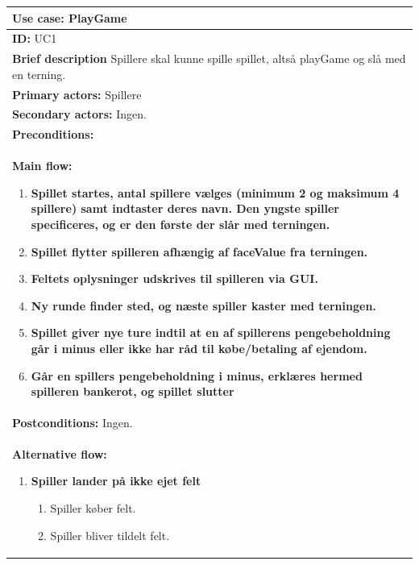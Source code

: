 \begin{table}[H]
    \begin{center}
        \begin{tabular}{ | p{15cm} |}
            \hline
            \textbf{Use case:} PlayGame \\ \hline
            \textbf{ID:} UC1 \\ \hline
            \textbf{Brief description} Spillere skal kunne spille spillet, altså playGame og slå med en terning.     \\ \hline
            \textbf{Primary actors:} Spillere \\ \hline
            \textbf{Secondary actors:} Ingen. \\ \hline
            \textbf{Preconditions:}      \\ \hline
            \textbf{Main flow:}
            \begin{enumerate}
                \item \textbf{Spillet startes, antal spillere vælges (minimum 2 og maksimum 4 spillere) samt indtaster deres navn. Den yngste spiller specificeres, og er den første der slår med terningen.}
                \item \textbf{Spillet flytter spilleren afhængig af faceValue fra terningen.}
                \item \textbf{Feltets oplysninger udskrives til spilleren via GUI.}
                \item \textbf{Ny runde finder sted, og næste spiller kaster med terningen.}
                \item \textbf{Spillet giver nye ture indtil at en af spillerens pengebeholdning går i minus eller ikke har råd til købe/betaling af ejendom.}
                \item \textbf{Går en spillers pengebeholdning i minus, erklæres hermed spilleren bankerot, og spillet slutter}
            \end{enumerate} \\ \hline
            \textbf{Postconditions:} Ingen.\\ \hline
            \textbf{Alternative flow:}
            \begin{enumerate}
                \item \textbf{Spiller lander på ikke ejet felt}
                \begin{enumerate}
                    \item {Spiller køber felt.}
                    \item {Spiller bliver tildelt felt.}

\end{enumerate}
\end{enumerate}
\end{tabular}
\end{center}
\end{table}
